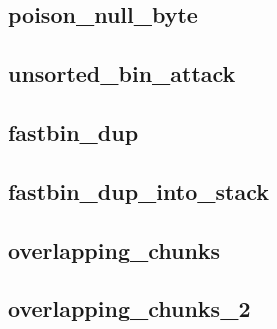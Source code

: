 \subsection{poison\_null\_byte}

\subsection{unsorted\_bin\_attack}

\subsection{fastbin\_dup}

\subsection{fastbin\_dup\_into\_stack}

\subsection{overlapping\_chunks}

\subsection{overlapping\_chunks\_2}

\newpage